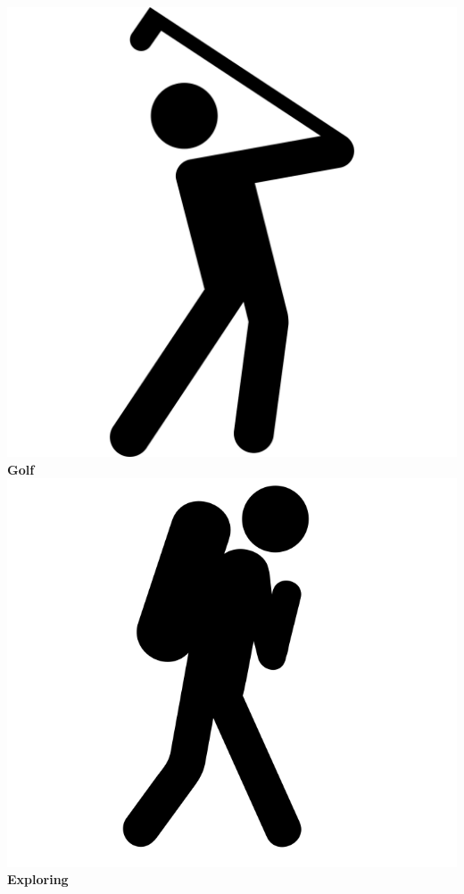 \documentclass[]{friggeri-cv}
\begin{document}
\begin{aside}
        \includegraphics[scale=0.03]{img/golf.png}
    \textbf{Golf}
        \includegraphics[scale=0.06]{img/exploring.png}
    \textbf{Exploring}

\end{aside}
\end{document}
